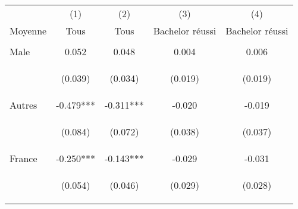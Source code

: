 \begin{center}
\begin{tabular}{lcccc} \hline
 & (1) & (2) & (3) & (4) \\
Moyenne & Tous & Tous & Bachelor réussi & Bachelor réussi \\ \hline
\vspace{4pt} & \begin{footnotesize}\end{footnotesize} & \begin{footnotesize}\end{footnotesize} & \begin{footnotesize}\end{footnotesize} & \begin{footnotesize}\end{footnotesize} \\
Male & 0.052 & 0.048 & 0.004 & 0.006 \\
\vspace{4pt} & \begin{footnotesize}(0.039)\end{footnotesize} & \begin{footnotesize}(0.034)\end{footnotesize} & \begin{footnotesize}(0.019)\end{footnotesize} & \begin{footnotesize}(0.019)\end{footnotesize} \\
Autres & -0.479*** & -0.311*** & -0.020 & -0.019 \\
\vspace{4pt} & \begin{footnotesize}(0.084)\end{footnotesize} & \begin{footnotesize}(0.072)\end{footnotesize} & \begin{footnotesize}(0.038)\end{footnotesize} & \begin{footnotesize}(0.037)\end{footnotesize} \\
France & -0.250*** & -0.143*** & -0.029 & -0.031 \\
\vspace{4pt} & \begin{footnotesize}(0.054)\end{footnotesize} & \begin{footnotesize}(0.046)\end{footnotesize} & \begin{footnotesize}(0.029)\end{footnotesize} & \begin{footnotesize}(0.028)\end{footnotesize} \\

\end{tabular}
\end{center}
